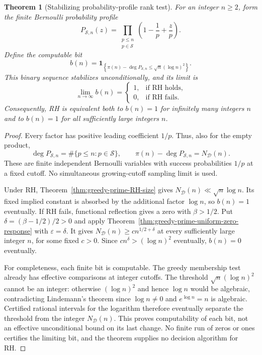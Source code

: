 \documentclass[11pt]{article}
\newtheorem{theorem}{Theorem}[section]
\theoremstyle{definition}
\begin{document}
\newpage
\begin{theorem}[Stabilizing probability-profile rank test]
For an integer $n\ge2$, form the finite Bernoulli probability profile%
\label{thm:greedy-prime-RH-rank-clock}
\[
 P_{\mathcal S,n}(z)
 =\prod_{\substack{p\le n\\p\in\mathcal S}}
       \left(1-\frac1p+\frac zp\right).
\]
Define the computable bit
\begin{equation}\label{eq:greedy-prime-RH-rank-bit}
 b(n)=
 \boldsymbol1_{\left\{
 \pi(n)-\deg P_{\mathcal S,n}\le\sqrt n(\log n)^2
 \right\}}.
\end{equation}
This binary sequence stabilizes unconditionally, and its limit is
\begin{equation}\label{eq:greedy-prime-RH-rank-bit-limit}
 \lim_{n\to\infty}b(n)=
 \begin{cases}
 1,&\text{if RH holds},\\
 0,&\text{if RH fails}.
 \end{cases}
\end{equation}
Consequently, RH is equivalent both to $b(n)=1$ for infinitely many
integers $n$ and to $b(n)=1$ for all sufficiently large integers $n$.
\end{theorem}

\begin{proof}
Every factor has positive leading coefficient $1/p$. Thus, also for the
empty product,
\[
 \deg P_{\mathcal S,n}=\#\{p\le n:p\in\mathcal S\},
 \qquad
 \pi(n)-\deg P_{\mathcal S,n}=N_{\mathcal D}(n).
\]
These are finite independent Bernoulli variables with success probabilities
$1/p$ at a fixed cutoff. No simultaneous growing-cutoff sampling limit
is used.

Under RH, Theorem~\ref{thm:greedy-prime-RH-size} gives
$N_{\mathcal D}(n)\ll\sqrt n\log n$. Its fixed implied constant is absorbed
by the additional factor $\log n$, so $b(n)=1$ eventually.
If RH fails, functional reflection gives a zero with
$\beta>1/2$. Put $\delta=(\beta-1/2)/2>0$ and apply
Theorem~\ref{thm:greedy-prime-uniform-zero-response}
with $\varepsilon=\delta$. It gives
$N_{\mathcal D}(n)\ge c n^{1/2+\delta}$ at every sufficiently large
integer $n$, for some fixed $c>0$.
Since $c n^\delta>(\log n)^2$ eventually, $b(n)=0$ eventually.

For completeness, each finite bit is computable. The greedy membership
test already has effective comparisons at integer cutoffs.
The threshold $\sqrt n(\log n)^2$ cannot be an integer: otherwise
$(\log n)^2$ and hence $\log n$ would be algebraic, contradicting
Lindemann's theorem since $\log n\ne0$ and $e^{\log n}=n$ is algebraic.
Certified rational intervals for the logarithm therefore eventually
separate the threshold from the integer $N_{\mathcal D}(n)$.
This proves computability of each bit, not an effective unconditional
bound on its last change. No finite run of zeros or ones certifies the
limiting bit, and the theorem supplies no decision algorithm for RH.
\end{proof}
\end{document}

